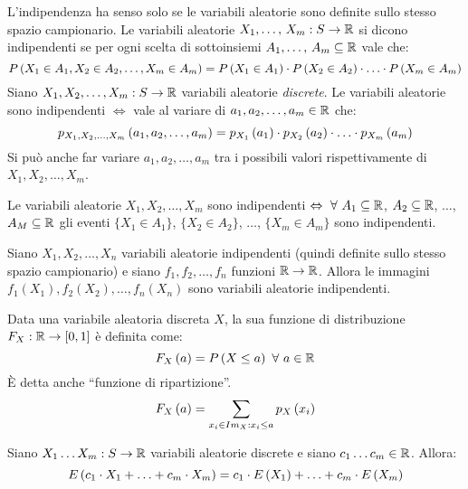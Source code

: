 \begin{defn}
L'indipendenza ha senso solo se le variabili aleatorie sono definite sullo stesso spazio campionario. Le variabili aleatorie $\seq{X}{1}{m} : S \to \reals$ si dicono indipendenti se per ogni scelta di sottoinsiemi $\seq{A}{1}{m} \subseteq \reals$ vale che:
\[
\prob{X_1 \in A_1, X_2 \in A_2, \ldots, X_m \in A_m} = \prob{X_1 \in A_1} \cdot \prob{X_2 \in A_2} \cdot \ldots \cdot \prob{X_m \in A_m}
\]
Siano $X_1, X_2, \ldots, X_m : S \to \reals$ variabili aleatorie \emph{discrete}. Le variabili aleatorie sono indipendenti $\iff$ vale al variare di $a_1, a_2, \ldots, a_m \in \reals$ che:
\[
\mass[X_1, X_2, \ldots, X_m]{a_1, a_2, \ldots, a_m} = \mass[X_1]{a_1} \cdot \mass[X_2]{a_2} \cdot \ldots \cdot \mass[X_m]{a_m}
\]
Si pu\`o anche far variare $a_1, a_2, \ldots, a_m$ tra i possibili valori rispettivamente di $X_1, X_2, \ldots, X_m$.
\end{defn}

\begin{fact}
Le variabili aleatorie $X_1, X_2, \ldots, X_m$ sono indipendenti $\iff \forall A_1 \subseteq \reals$, $A_2 \subseteq \reals$, $\ldots$, $A_M \subseteq \reals$ gli eventi $\{X_1 \in A_1\}$, $\{X_2 \in A_2\}$, $\ldots$, $\{ X_m \in A_m\}$ sono indipendenti.
\end{fact}

\begin{prop}
Siano $X_1, X_2, \ldots, X_n$ variabili aleatorie indipendenti (quindi definite sullo stesso spazio campionario) e siano $f_1, f_2, \ldots, f_n$ funzioni $\reals \to \reals$. Allora le immagini $f_1(X_1), f_2(X_2), \ldots, f_n(X_n)$ sono variabili aleatorie indipendenti.
\end{prop}

\begin{defn}
Data una variabile aleatoria discreta $X$, la sua funzione di distribuzione $F_X : \reals \to [0,1]$ \`e definita come:
\[
\distr{a} = \prob{X \le a} \forall a \in \reals
\]
\`E detta anche ``funzione di ripartizione''.
\[
\distr{a} = \sum_{x_i \in \image{X} : x_i \le a} \mass{x_i}
\]
\end{defn}

\begin{prop}
Siano $X_1 \ldots X_m : S \to \reals$ variabili aleatorie discrete e siano $c_1 \ldots c_m \in \reals$. Allora:
\[
\expect{c_1 \cdot X_1 + \ldots + c_m \cdot X_m} = c_1 \cdot \expect{X_1} + \ldots + c_m \cdot \expect{X_m}
\]
\end{prop}

